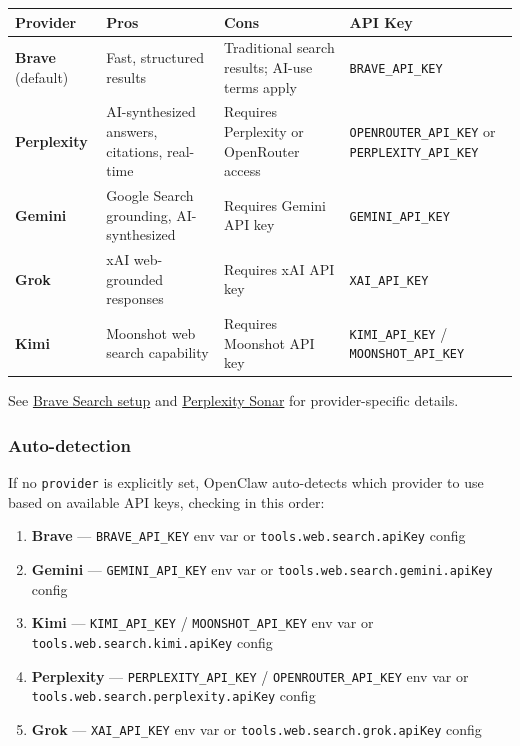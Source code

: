 \begin{table}[h]
\centering
\small
\begin{tabular}{|l|l|l|l|}
\hline
Provider & Pros & Cons & API Key \\
\hline
\textbf{Brave} (default) & Fast, structured results & Traditional search results; AI-use terms apply & \texttt{BRAVE\_API\_KEY} \\
\hline
\textbf{Perplexity} & AI-synthesized answers, citations, real-time & Requires Perplexity or OpenRouter access & \texttt{OPENROUTER\_API\_KEY} or \texttt{PERPLEXITY\_API\_KEY} \\
\hline
\textbf{Gemini} & Google Search grounding, AI-synthesized & Requires Gemini API key & \texttt{GEMINI\_API\_KEY} \\
\hline
\textbf{Grok} & xAI web-grounded responses & Requires xAI API key & \texttt{XAI\_API\_KEY} \\
\hline
\textbf{Kimi} & Moonshot web search capability & Requires Moonshot API key & \texttt{KIMI\_API\_KEY} / \texttt{MOONSHOT\_API\_KEY} \\
\hline
\end{tabular}
\end{table}



See \href{/brave-search}{Brave Search setup} and \href{/perplexity}{Perplexity Sonar} for provider-specific details.

\subsubsection{Auto-detection}


If no \texttt{provider} is explicitly set, OpenClaw auto-detects which provider to use based on available API keys, checking in this order:

\begin{enumerate}
  \item \textbf{Brave} — \texttt{BRAVE\_API\_KEY} env var or \texttt{tools.web.search.apiKey} config
  \item \textbf{Gemini} — \texttt{GEMINI\_API\_KEY} env var or \texttt{tools.web.search.gemini.apiKey} config
  \item \textbf{Kimi} — \texttt{KIMI\_API\_KEY} / \texttt{MOONSHOT\_API\_KEY} env var or \texttt{tools.web.search.kimi.apiKey} config
  \item \textbf{Perplexity} — \texttt{PERPLEXITY\_API\_KEY} / \texttt{OPENROUTER\_API\_KEY} env var or \texttt{tools.web.search.perplexity.apiKey} config
  \item \textbf{Grok} — \texttt{XAI\_API\_KEY} env var or \texttt{tools.web.search.grok.apiKey} config
\end{enumerate}


